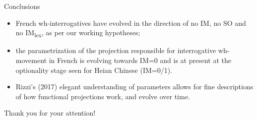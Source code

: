 \documentclass[lesson_slides]{subfiles}
\begin{document}
\begin{frame}[c]{Conclusions}

        \begin{itemize}
        \item[\ding{227}] French wh-interrogatives have evolved in the direction of no IM, no SO and no IM\textsubscript{lex}, as per our working hypotheses; \pause
        \item[\ding{227}] the parametrization of the projection responsible for interrogative wh-movement in French is evolving towards IM=0 and is at present at the optionality stage seen for Heian Chinese (IM=0/1).  \pause
        \item[\ding{227}] Rizzi's (2017) elegant understanding of parameters allows for fine descriptions of how functional projections work, and evolve over time.
        \end{itemize}
  
\end{frame}
\begin{frame}[c]{}

\begin{center}
    \huge{Thank you for your attention!}
\end{center}
  
\end{frame}
\end{document}
